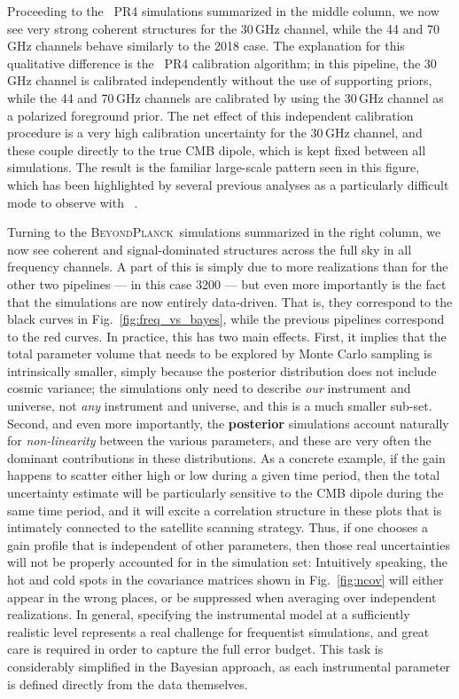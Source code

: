 \documentclass[twocolumn]{aa}%
\newcommand{\BP}{\textsc{BeyondPlanck}}
\begin{document}
Proceeding to the \Planck\ PR4 simulations summarized in the middle
column, we now see very strong coherent structures for the 30\,GHz
channel, while the 44 and 70\,GHz
channels behave similarly to the 2018 case. The
explanation for this qualitative difference is the \Planck\ PR4
calibration algorithm; in this pipeline, the 30\,GHz channel is
calibrated independently without the use of supporting priors, while
the 44 and 70\,GHz channels are calibrated by using the 30\,GHz
channel as a polarized foreground prior. The net effect of this
independent calibration procedure is a very high calibration
uncertainty for the 30\,GHz channel, and these couple directly to the
true CMB dipole, which is kept fixed between all simulations. The
result is the familiar large-scale pattern seen in this figure, which
has been highlighted by several previous analyses as a particularly
difficult mode to observe with
\Planck\ \citep[e.g.,][]{planck2016-l02,bp07,bp17}.

Turning to the \BP\ simulations summarized in the right column, we now
see coherent and signal-dominated structures across the full sky in
all frequency channels. A part of this is simply due to more
realizations than for the other two pipelines --- in this case 3200
--- but even more importantly is the fact that the simulations are now
entirely data-driven. That is, they correspond to the black curves in
Fig.~\ref{fig:freq_vs_bayes}, while the previous pipelines correspond
to the red curves. In practice, this has two main effects. First, it
implies that the total parameter volume that needs to be explored by
Monte Carlo sampling is intrinsically smaller, simply because the
posterior distribution does not include cosmic variance; the
simulations only need to describe \emph{our} instrument and universe,
not \emph{any} instrument and universe, and this is a much smaller
sub-set. Second, and even more importantly, the {\bf posterior} simulations
account naturally for \emph{non-linearity} between the various
parameters, and these are very often the dominant contributions in
these distributions. As a concrete example, if the gain happens to
scatter either high or low during a given time period, then the total
uncertainty estimate will be particularly sensitive to the CMB dipole
during the same time period, and it will excite a correlation
structure in these plots that is intimately connected to the satellite
scanning strategy. Thus, if one chooses a gain profile that is
independent of other parameters, then those real uncertainties will
not be properly accounted for in the simulation set: Intuitively
speaking, the hot and cold spots in the covariance matrices shown in
Fig.~\ref{fig:ncov} will either appear in the wrong places, or be
suppressed when averaging over independent realizations. In general,
specifying the instrumental model at a sufficiently realistic level
represents a real challenge for frequentist simulations, and great
care is required in order to capture the full error budget. This task
is considerably simplified in the Bayesian approach, as each
instrumental parameter is defined directly from the data themselves.
\end{document}
